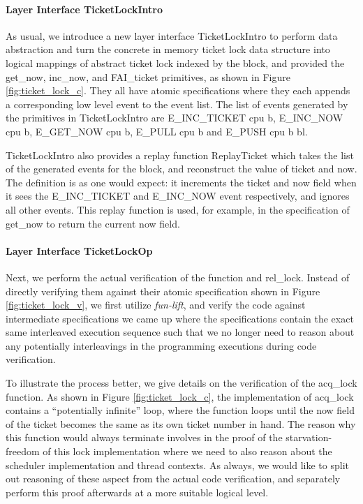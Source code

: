 \paragraph{Layer Interface TicketLockIntro}
As usual, we introduce a new layer interface TicketLockIntro to perform data
abstraction and turn the concrete in memory ticket lock
data structure into logical mappings of abstract ticket lock indexed by the block,
and provided the \textsf{get\_now}, \textsf{inc\_now}, and \textsf{FAI\_ticket}
primitives, as shown in Figure \ref{fig:ticket_lock_c}. They all have atomic specifications
where they each appends a corresponding low level event to the event list.
The list of events generated by the primitives in TicketLockIntro are
\textsf{E\_INC\_TICKET cpu b}, \textsf{E\_INC\_NOW cpu b}, \textsf{E\_GET\_NOW cpu b}, 
\textsf{E\_PULL cpu b} and \textsf{E\_PUSH cpu b bl}.

TicketLockIntro also provides a replay function \textsf{ReplayTicket} which takes the
list of the generated events for the block, and reconstruct the value of \textsf{ticket} and
\textsf{now}. The definition is as one would expect: it increments the \textsf{ticket} and
\textsf{now} field when it sees the \textsf{E\_INC\_TICKET} and \textsf{E\_INC\_NOW}
event respectively, and ignores all other events. This replay function is used, for example,
in the specification of \textsf{get\_now} to return the current \textsf{now} field.


\paragraph{Layer Interface TicketLockOp}

Next, we perform the actual verification of the function  and \textsf{rel\_lock}.
Instead of directly verifying them against their atomic specification shown in Figure
\ref{fig:ticket_lock_v}, we first utilize \emph{fun-lift}, and verify the code against
intermediate specifications we came up where the specifications contain the exact same
interleaved execution sequence such that we no longer need to reason about
any potentially interleavings in the programming executions during code verification.

To illustrate the process better, we give details on the verification of the \textsf{acq\_lock}
function. As shown in Figure \ref{fig:ticket_lock_c}, the implementation of \textsf{acq\_lock}
contains a ``potentially infinite'' loop, where the function loops until the \textsf{now} field
of the ticket becomes the same as its own ticket number in hand.
The reason why this function would always terminate involves in the proof of the starvation-freedom
of this lock implementation where we need to also reason about the scheduler implementation and
thread contexts. As always, we would like to split out reasoning of these aspect from the actual
code verification, and separately perform this proof afterwards at a more suitable logical level.

